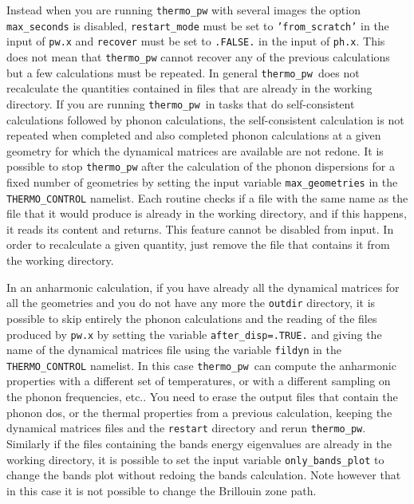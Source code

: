 \documentclass[12pt,a4paper]{article}
\def\thermo{\texttt{thermo\_pw}}
\begin{document}
Instead when you are running \texttt{thermo\_pw} with several images the option 
\texttt{max\_seconds} is disabled, \texttt{restart\_mode} must 
be set to \texttt{'from\_scratch'} in the input of \texttt{pw.x} and
\texttt{recover} must be set to \texttt{.FALSE.} in the input of \texttt{ph.x}.
This does not mean that \texttt{thermo\_pw} cannot recover any of the previous
calculations but a few calculations must be repeated. In general \thermo\ 
does not recalculate the quantities contained in files that are already 
in the working directory. If you are running \thermo\ in tasks that do 
self-consistent calculations followed by phonon calculations, the 
self-consistent calculation is not repeated 
when completed and also completed phonon calculations at a given
geometry for which the dynamical matrices are available are
not redone. It is possible to stop \texttt{thermo\_pw} after the 
calculation of the phonon dispersions for a fixed number of geometries 
by setting the input variable \texttt{max\_geometries} in the 
\texttt{THERMO\_CONTROL} namelist. 
Each routine checks if a file with the same name
as the file that it would produce is already in the working directory,
and if this happens, it reads its content and returns. This feature cannot be
disabled from input. In order to recalculate a given quantity, just remove
the file that contains it from the working directory.

In an anharmonic calculation, if you have already all the dynamical 
matrices for all the geometries and you do not have any more the
\texttt{outdir} directory, it is possible to skip entirely
the phonon calculations and the reading of the files produced by
\texttt{pw.x} by setting the variable
\texttt{after\_disp=.TRUE.} and giving the name of the dynamical matrices file
using the variable \texttt{fildyn} in the \texttt{THERMO\_CONTROL} namelist. 
In this case \thermo\ can compute the anharmonic properties with a 
different set 
of temperatures, or with a different sampling on the phonon frequencies, 
etc.. You need to erase the output files that contain
the phonon dos, or the thermal properties from a previous calculation, keeping 
the dynamical matrices files and the \texttt{restart} directory and 
rerun \thermo.
Similarly if the files containing the bands energy eigenvalues are already
in the working directory, it is possible to set the input variable
\texttt{only\_bands\_plot} to change the bands plot without redoing the
bands calculation. Note however that in this case it is not possible 
to change the Brillouin zone path. \\
\end{document}
